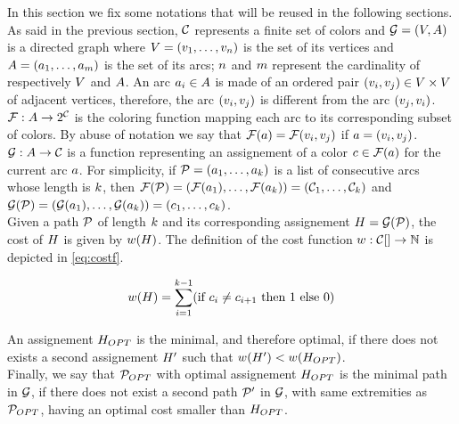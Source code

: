 In this section we fix some notations that will be reused in the following sections.\\
As said in the previous section, $\mathcal{C}$ represents a finite set of colors and $\mathcal{G} = (V, A)$ is a directed graph where $V = (v_1,\ldots,v_{n})$ is the set of its vertices and $A = (a_1,\ldots,a_{m})$ is the set of its arcs; $n$ and $m$ represent the cardinality of respectively $V$ and $A$. An arc $a_i \in A$ is made of an ordered pair $(v_i, v_j) \in V \times V$ of adjacent vertices, therefore, the arc $(v_i, v_j)$ is different from the arc $(v_j, v_i)$.\\
$\mathcal{F} : A \rightarrow 2^{\mathcal{C}}$ is the coloring function mapping each arc to its corresponding subset of colors. By abuse of notation we say that $\mathcal{F}(a) = \mathcal{F}(v_i, v_j)$ if $a = (v_i, v_j)$.\\
$\mathcal{G}: A \rightarrow \mathcal{C}$ is a function representing an assignement of a color $c \in \mathcal{F}(a)$ for the current arc $a$. For simplicity, if $\mathcal{P} = (a_1,\ldots,a_{k})$ is a list of consecutive arcs whose length is $k$, then $\mathcal{F}(\mathcal{P}) = (\mathcal{F}(a_1), \dots, \mathcal{F}(a_k)) = (\mathcal{C}_1,\ldots,\mathcal{C}_{k})$ and $\mathcal{G}(\mathcal{P}) = (\mathcal{G}(a_1), \dots, \mathcal{G}(a_k))  = (c_1,\ldots,c_{k})$.\\
Given a path $\mathcal{P}$ of length $k$ and its corresponding assignement $H = \mathcal{G}(\mathcal{P})$, the cost of $H$ is given by $w(H)$. The definition of the cost function $w : \mathcal{C}[] \rightarrow \mathbb{N}$ is depicted in \cref{eq:costf}.

\begin{equation}
	\label{eq:costf}
	w(H) = \sum\limits_{i = 1}^{k-1} (\text{if } c_i \neq c_{i+1} \text{ then } 1 \text{ else } 0)
\end{equation}

An assignement $H_{OPT}$ is the minimal, and therefore optimal, if there does not exists a second assignement $H'$ such that $w(H') < w(H_{OPT})$.\\
Finally, we say that $\mathcal{P}_{OPT}$ with optimal assignement $H_{OPT}$ is the minimal path in $\mathcal{G}$, if there does not exist a second path $\mathcal{P}'$ in $\mathcal{G}$, with same extremities as $\mathcal{P}_{OPT}$, having an optimal cost smaller than $H_{OPT}$.